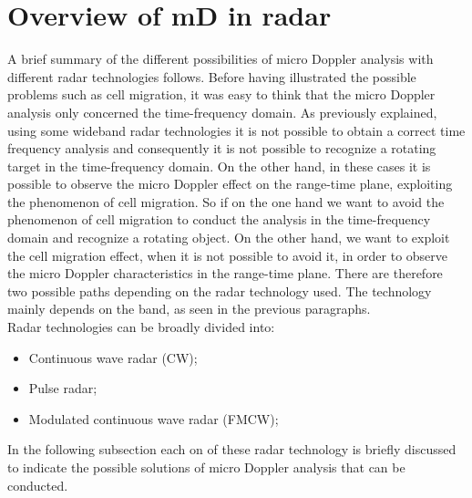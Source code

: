 \section{Overview of mD in radar}
A brief summary of the different possibilities of micro Doppler analysis with different radar technologies follows. Before having illustrated  the possible problems such as cell migration, it was easy to think that the micro Doppler analysis only concerned the time-frequency domain. As previously explained, using some wideband radar technologies it is not possible to obtain a correct time frequency analysis and consequently it is not possible to recognize a rotating target in the time-frequency domain. On the other hand, in these cases it is possible to observe the micro Doppler effect on the range-time plane, exploiting the phenomenon of cell migration. So if on the one hand we want to avoid the phenomenon of cell migration to conduct the analysis in the time-frequency domain and recognize a rotating object. On the other hand, we want to exploit the cell migration effect, when it is not possible to avoid it, in order to observe the micro Doppler characteristics in the range-time plane. There are therefore two possible paths depending on the radar technology used. The technology mainly depends on the band, as seen in the previous paragraphs.\\
Radar technologies can be broadly divided into:
\begin{itemize}
    \item Continuous wave radar (CW);
         
    \item Pulse radar;
    
    \item Modulated continuous wave radar (FMCW);
\end{itemize}
In the following subsection each on of these  radar technology is briefly discussed to indicate the possible solutions of micro Doppler analysis that can be conducted.
